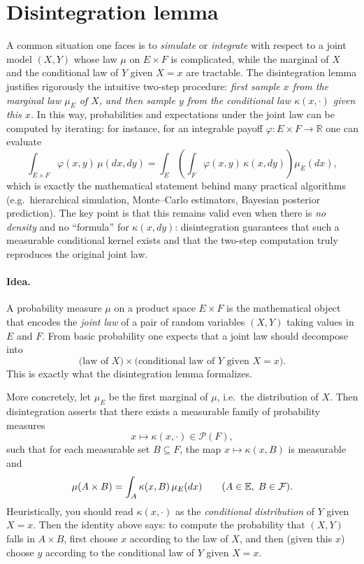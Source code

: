 \section{Disintegration lemma}
A common situation one faces is to \emph{simulate} or \emph{integrate} with respect to a joint model $(X,Y)$ whose law $\mu$ on $E\times F$ is complicated, while the marginal of $X$ and the conditional law of $Y$ given $X=x$ are tractable.  The disintegration lemma justifies rigorously the intuitive two-step procedure: \emph{first sample $x$ from the marginal law $\mu_E$ of $X$, and then sample $y$ from the conditional law $\kappa(x,\cdot)$ given this $x$.}  In this way, probabilities and expectations under the joint law can be computed by iterating: for instance, for an integrable payoff $\varphi:E\times F\to\mathbb{R}$ one can evaluate
\[
\int_{E\times F}\varphi(x,y)\,\mu(dx,dy)
=\int_E\left(\int_F \varphi(x,y)\,\kappa(x,dy)\right)\mu_E(dx),
\]
which is exactly the mathematical statement behind many practical algorithms (e.g.\ hierarchical simulation, Monte--Carlo estimators, Bayesian posterior prediction).  The key point is that this remains valid even when there is \emph{no density} and no ``formula'' for $\kappa(x,dy)$: disintegration guarantees that such a measurable conditional kernel exists and that the two-step computation truly reproduces the original joint law.

\paragraph{Idea.}
A probability measure $\mu$ on a product space $E\times F$ is the mathematical object that encodes the
\emph{joint law} of a pair of random variables $(X,Y)$ taking values in $E$ and $F$.
From basic probability one expects that a joint law should decompose into
\[
\text{(law of }X)\times \text{(conditional law of }Y\text{ given }X=x).
\]
This is exactly what the disintegration lemma formalizes.

More concretely, let $\mu_E$ be the first marginal of $\mu$, i.e.\ the distribution of $X$.
Then disintegration asserts that there exists a measurable family of probability measures
\[
x \longmapsto \kappa(x,\cdot)\in \mathcal{P}(F),
\]
such that for each measurable set $B\subseteq F$, the map $x\mapsto \kappa(x,B)$ is measurable and
\[
\mu(A\times B)=\int_A \kappa(x,B)\,\mu_E(dx)\qquad (A\in\mathbb{E},\;B\in\mathcal{F}).
\]
Heuristically, you should read $\kappa(x,\cdot)$ as the \emph{conditional distribution} of $Y$ given $X=x$.
Then the identity above says: to compute the probability that $(X,Y)$ falls in $A\times B$,
first choose $x$ according to the law of $X$, and then (given this $x$) choose $y$ according to the conditional law of $Y$ given $X=x$.

